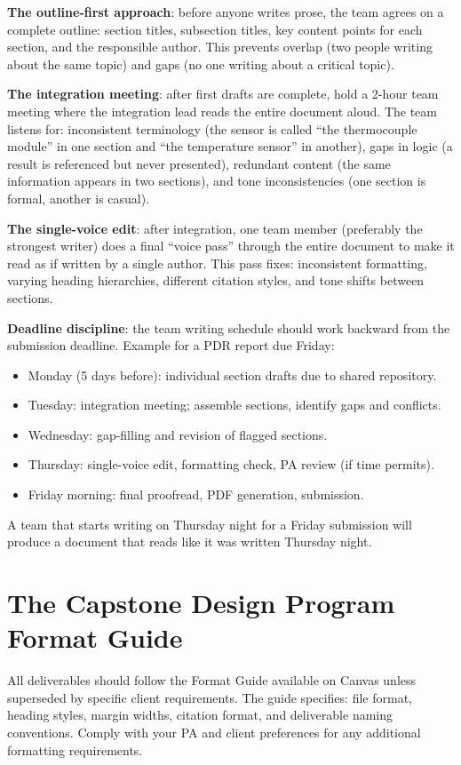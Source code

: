 \textbf{The outline-first approach}: before anyone writes prose, the team agrees on a complete outline: section titles, subsection titles, key content points for each section, and the responsible author. This prevents overlap (two people writing about the same topic) and gaps (no one writing about a critical topic).

\textbf{The integration meeting}: after first drafts are complete, hold a 2-hour team meeting where the integration lead reads the entire document aloud. The team listens for: inconsistent terminology (the sensor is called ``the thermocouple module'' in one section and ``the temperature sensor'' in another), gaps in logic (a result is referenced but never presented), redundant content (the same information appears in two sections), and tone inconsistencies (one section is formal, another is casual).

\textbf{The single-voice edit}: after integration, one team member (preferably the strongest writer) does a final ``voice pass'' through the entire document to make it read as if written by a single author. This pass fixes: inconsistent formatting, varying heading hierarchies, different citation styles, and tone shifts between sections.

\textbf{Deadline discipline}: the team writing schedule should work backward from the submission deadline. Example for a PDR report due Friday:
\begin{itemize}[nosep,leftmargin=1.5em]
\item Monday (5 days before): individual section drafts due to shared repository.
\item Tuesday: integration meeting; assemble sections, identify gaps and conflicts.
\item Wednesday: gap-filling and revision of flagged sections.
\item Thursday: single-voice edit, formatting check, PA review (if time permits).
\item Friday morning: final proofread, PDF generation, submission.
\end{itemize}

A team that starts writing on Thursday night for a Friday submission will produce a document that reads like it was written Thursday night.

\section{The Capstone Design Program Format Guide}
All deliverables should follow the Format Guide available on Canvas unless superseded by specific client requirements. The guide specifies: file format, heading styles, margin widths, citation format, and deliverable naming conventions. Comply with your PA and client preferences for any additional formatting requirements.

